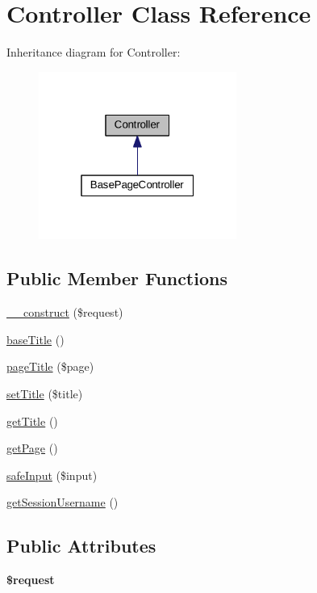 \hypertarget{classController}{\section{Controller Class Reference}
\label{classController}
}


Inheritance diagram for Controller\+:\nopagebreak
\begin{figure}[H]
\begin{center}
\leavevmode
\includegraphics[width=184pt]{classController__inherit__graph}
\end{center}
\end{figure}
\subsection*{Public Member Functions}
\begin{DoxyCompactItemize}
\item 
\hyperlink{classController_ab91faf91a99b21a429324499f9ec9f70}{\+\_\+\+\_\+construct} (\$request)
\item 
\hyperlink{classController_a3057228d46eddceb352a1537ef05e8b7}{base\+Title} ()
\item 
\hyperlink{classController_a555247a38f8b4ea98a85bed7c6798e0a}{page\+Title} (\$page)
\item 
\hyperlink{classController_ae560b1221cb9f3891c432c3dd0292922}{set\+Title} (\$title)
\item 
\hyperlink{classController_ae8b4904843b2d665164620160b3c7157}{get\+Title} ()
\item 
\hyperlink{classController_aa844281accdd5aa2ca1ab1d890332b76}{get\+Page} ()
\item 
\hyperlink{classController_a90590c2cd8c1a89cc6eada64f0f24361}{safe\+Input} (\$input)
\item 
\hyperlink{classController_ac85206dce558e214f72fc3ca56f8cc31}{get\+Session\+Username} ()
\end{DoxyCompactItemize}
\subsection*{Public Attributes}
\begin{DoxyCompactItemize}
\item 
\hypertarget{classController_ae09902e0cf33dbffd52349e056794842}{{\bfseries \$request}}\label{classController_ae09902e0cf33dbffd52349e056794842}

\end{DoxyCompactItemize}
